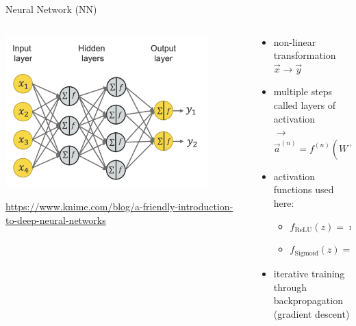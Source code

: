 \documentclass[aspectratio=1610, 10pt]{beamer}
\begin{document}
\begin{frame}{Neural Network (NN)}
  \begin{columns}
    \begin{column}{0.5\textwidth}
      \centering
      \includegraphics[width=0.85\textwidth]{images/NN_schematic.png}

      \tiny \url{https://www.knime.com/blog/a-friendly-introduction-to-deep-neural-networks}
    \end{column}
    \begin{column}{0.5\textwidth}
      \begin{itemize}
        \item non-linear transformation $\vec{x} \rightarrow \vec{y}$
        \item multiple steps called layers of activation \\$\rightarrow$ $\vec{a}^{(n)} = f^{(n)}\left( W^{(n)} \cdot \vec{a}^{(n-1)} + \vec{b}^{n} \right)$
        \item activation functions used here:
        \begin{itemize}
          \item $f_\text{ReLU}(z) = \max (0, z)$
          \item $f_\text{Sigmoid}(z) = \frac{1}{1+e^{-z}}$
        \end{itemize}
        \item iterative training through backpropagation (gradient descent)
      \end{itemize}
    \end{column}
  \end{columns}
\end{frame}
\end{document}
